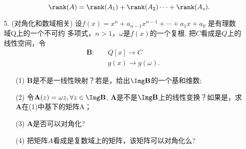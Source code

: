 \begin{itemize}
\begin{itemize}
              $$ \rank(A) = \rank(A_1) + \rank(A_2) \cdots + \rank(A_s).$$
    \end{itemize}
    \vspace{3cm}
    \item [5. ] (对角化和数域相关) 设$f(x)=x^n +a_{n-1}x^{n-1} +\cdots +a_1 x +a_0$ 是有理数域Q上的一个不可约
    多项式，$n>1$，$\omega$是$f(x)$的一个复根. 把$C$看成是$Q$上的线性空间，令
    \begin{equation}
        \nonumber
        \begin{aligned}
        \mathbf{B}:\quad &Q[x] \longrightarrow C\\
                         &g(x) \longrightarrow g(\omega).
        \end{aligned}
    \end{equation}
    \begin{itemize}
        \item[(1) ] $\mathbf{B}$是不是一线性映射？若是，给出$\Img \mathbf{B}$的一个基和维数;
        \item[(2) ] 令$\mathbf{A}(z) = \omega z, \forall z \in \Img \mathbf{B}$, 
                    $\mathbf{A}$是不是$\Img \mathbf{B}$上的线性变换？如果是，求$\mathbf{A}$在(1)中基下的矩阵A；
        \item[(3) ] $\mathbf{A}$是否可以对角化?
        \item[(4) ] 把矩阵$A$看成是复数域上的矩阵，该矩阵可以对角化么?
    \end{itemize}
    \vspace{3cm}
\end{itemize}
